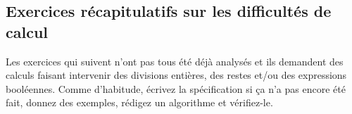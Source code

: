 

			
		\subsection{Exercices récapitulatifs sur les difficultés de calcul}
		\label{prem-ex-cplx}
		
			Les exercices qui suivent n’ont pas tous été déjà analysés
			et ils demandent des calculs faisant intervenir
			des divisions entières, des restes et/ou des expressions booléennes.
			Comme d’habitude, écrivez la spécification
			si ça n’a pas encore été fait,
			donnez des exemples, rédigez un algorithme
			et vérifiez-le.
		
